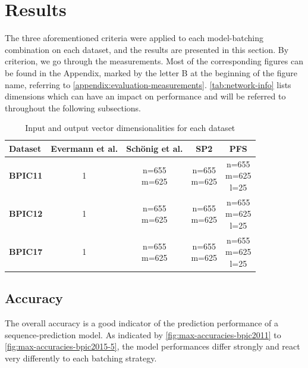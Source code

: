 \section{Results}\label{sec:eval:results}
The three aforementioned criteria were applied to each model-batching combination on each dataset, and the results are presented in this section. By criterion, we go through the measurements. Most of the corresponding figures can be found in the Appendix, marked by the letter B at the beginning of the figure name, referring to \autoref{appendix:evaluation-measurements}. \autoref{tab:network-info} lists dimensions which can have an impact on performance and will be referred to throughout the following subsections.

\begin{table}[htb!]
\centering
\begin{tabular}{lcccc}
\textbf{Dataset} & \textbf{Evermann et al.} & \textbf{Schönig et al.} & \textbf{SP2} & \textbf{PFS}\\
\hline
\hline
\textbf{BPIC11} & 1 & \makecell{n=655\\m=625} & \makecell{n=655\\m=625} & \makecell{n=655\\m=625\\ l=25} \\
\hline
\textbf{BPIC12} & 1 & \makecell{n=655\\m=625} & \makecell{n=655\\m=625} & \makecell{n=655\\m=625\\ l=25} \\
\hline
\textbf{BPIC17} & 1 & \makecell{n=655\\m=625} & \makecell{n=655\\m=625} & \makecell{n=655\\m=625\\ l=25} \\
\end{tabular}
\caption{Input and output vector dimensionalities for each dataset}
\label{tab:network-info}
\end{table}

\subsection*{Accuracy}
The overall accuracy is a good indicator of the prediction performance of a sequence-prediction model. As indicated by \autoref{fig:max-accuracies-bpic2011} to \autoref{fig:max-accuracies-bpic2015-5}, the model performances differ strongly and react very differently to each batching strategy.

